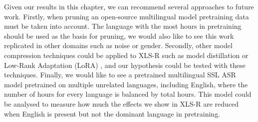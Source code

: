 Given our results in this chapter, we can recommend several approaches to future work. Firstly, when pruning an open-source multilingual model pretraining data must be taken into account. The language with the most hours in pretraining should be used as the basis for pruning, we would also like to see this work replicated in other domains such as noise or gender. Secondly, other model compression techniques could be applied to XLS-R such as model distillation \cite{distillation} or Low-Rank Adaptation (LoRA) \cite{hu2021lora}, and our hypothesis could be tested with these techniques. Finally, we would like to see a pretrained multilingual SSL ASR model pretrained on multiple unrelated languages, including English, where the number of hours for every language is balanced by total hours. This model could be analysed to measure how much the effects we show in XLS-R are reduced when English is present but not the dominant language in pretraining.

\newpage
